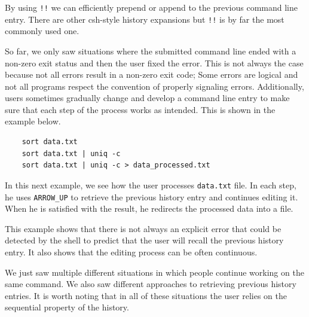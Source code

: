 \documentclass[thesis=M,english]{FITthesis}[2012/10/20]
\newcommand{\redtext}[1]{\textcolor{red}{[[#1]]}}
\begin{document}
By using \verb|!!| we can efficiently prepend or append to the previous command line entry. There are other csh-style history expansions but \verb|!!| is by far the most commonly used one. 

So far, we only saw situations where the submitted command line ended with a non-zero exit status and then the user fixed the error. This is not always the case because not all errors result in a non-zero exit code; Some errors are logical and not all programs respect the convention of properly signaling errors. Additionally, users sometimes gradually change and develop a command line entry to make sure that each step of the process works as intended. This is shown in the example below.

\begin{verbatim}
    sort data.txt
    sort data.txt | uniq -c
    sort data.txt | uniq -c > data_processed.txt
\end{verbatim}

In this next example, we see how the user processes \verb|data.txt| file. In each step, he uses \verb|ARROW_UP| to retrieve the previous history entry and continues editing it. When he is satisfied with the result, he redirects the processed data into a file. 

This example shows that there is not always an explicit error that could be detected by the shell to predict that the user will recall the previous history entry. It also shows that the editing process can be often continuous.

We just saw multiple different situations in which people continue working on the same command. We also saw different approaches to retrieving previous history entries. It is worth noting that in all of these situations the user relies on the sequential property of the history. 


\end{document}
